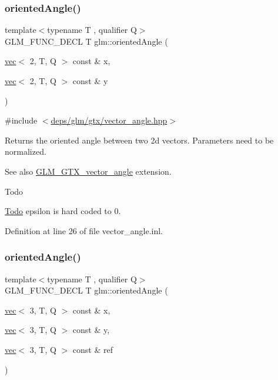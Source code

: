 \subsubsection{\texorpdfstring{oriented\+Angle()}{orientedAngle()}\hspace{0.1cm}{\footnotesize\ttfamily [1/2]}}
{\footnotesize\ttfamily template$<$typename T , qualifier Q$>$ \\
G\+L\+M\+\_\+\+F\+U\+N\+C\+\_\+\+D\+E\+CL T glm\+::oriented\+Angle (\begin{DoxyParamCaption}\item[{\hyperlink{structglm_1_1vec}{vec}$<$ 2, T, Q $>$ const \&}]{x,  }\item[{\hyperlink{structglm_1_1vec}{vec}$<$ 2, T, Q $>$ const \&}]{y }\end{DoxyParamCaption})}



{\ttfamily \#include $<$\hyperlink{vector__angle_8hpp}{deps/glm/gtx/vector\+\_\+angle.\+hpp}$>$}

Returns the oriented angle between two 2d vectors. Parameters need to be normalized. \begin{DoxySeeAlso}{See also}
\hyperlink{group__gtx__vector__angle}{G\+L\+M\+\_\+\+G\+T\+X\+\_\+vector\+\_\+angle} extension.
\end{DoxySeeAlso}
\begin{DoxyRefDesc}{Todo}
\item[\hyperlink{todo__todo000001}{Todo}]epsilon is hard coded to 0. \end{DoxyRefDesc}


Definition at line 26 of file vector\+\_\+angle.\+inl.

\mbox{\label{group__gtx__vector__angle_ga706fce3d111f485839756a64f5a48553}} 
\subsubsection{\texorpdfstring{oriented\+Angle()}{orientedAngle()}\hspace{0.1cm}{\footnotesize\ttfamily [2/2]}}
{\footnotesize\ttfamily template$<$typename T , qualifier Q$>$ \\
G\+L\+M\+\_\+\+F\+U\+N\+C\+\_\+\+D\+E\+CL T glm\+::oriented\+Angle (\begin{DoxyParamCaption}\item[{\hyperlink{structglm_1_1vec}{vec}$<$ 3, T, Q $>$ const \&}]{x,  }\item[{\hyperlink{structglm_1_1vec}{vec}$<$ 3, T, Q $>$ const \&}]{y,  }\item[{\hyperlink{structglm_1_1vec}{vec}$<$ 3, T, Q $>$ const \&}]{ref }\end{DoxyParamCaption})}



